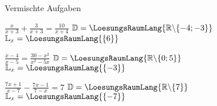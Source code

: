 \platzFuerBerechnungenBisEndeSeite{}




Vermischte Aufgaben


\begin{bbwAufgabenBlock}
\item $\frac{x}{x+3} + \frac{3}{x+3} = \frac{10}{x+4}$ \hspace{10mm}
$\mathbb{D}= \LoesungsRaumLang{\mathbb{R}\backslash\{-4;-3\}}$
$\mathbb{L}_x = \LoesungsRaumLang{\{  6  \}}$

\item $\frac{x-4}{x-5}  = \frac{30-x^2}{x^2-5x}$ \hspace{10mm}
$\mathbb{D}= \LoesungsRaumLang{\mathbb{R}\backslash\{0;5 \}}$
$\mathbb{L}_x = \LoesungsRaumLang{\{  -3  \}}$

\item $\frac{7x+1}{x-7}   - \frac{7x-1}{7-x} = 7$ \hspace{10mm}
$\mathbb{D}= \LoesungsRaumLang{\mathbb{R}\backslash\{7 \}}$
$\mathbb{L}_x = \LoesungsRaumLang{\{  -7  \}}$

\end{bbwAufgabenBlock}

\platzFuerBerechnungenBisEndeSeite{}




